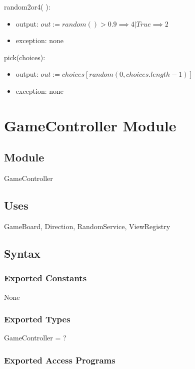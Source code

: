 \documentclass[12pt]{article}
\begin{document}
\noindent random2or4( ):
\begin{itemize}
\item output: $out := random() > 0.9 \implies 4 | True \implies 2$
\item exception: none
\end{itemize}

\noindent pick(choices):
\begin{itemize}
\item output: $out := choices[random(0, choices.length-1)]$
\item exception: none
\end{itemize}

\newpage









\section* {GameController Module}

\subsection*{Module}

GameController

\subsection* {Uses}

GameBoard, Direction, RandomService, ViewRegistry

\subsection* {Syntax}

\subsubsection* {Exported Constants}

None

\subsubsection* {Exported Types}

GameController = ?

\subsubsection* {Exported Access Programs}
\end{document}
